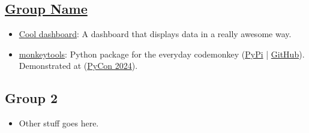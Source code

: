 \subsection*{\href{https://example.com/}{\textbf{Group Name}}}
\begin{itemize}
    \item[] \href{https://example.com}{Cool dashboard}: A dashboard that displays data in a really awesome way.
    
    \item[] \href{https://example.com}{monkeytools}: Python package for the everyday codemonkey (\href{https://pypi.org}{PyPi} | \href{https://github.com/}{GitHub}). Demonstrated at (\href{https://pycon.org/}{PyCon 2024}).
    

\end{itemize}


\subsection*{Group 2}

\begin{itemize}
    \item[] Other stuff goes here.
\end{itemize}

